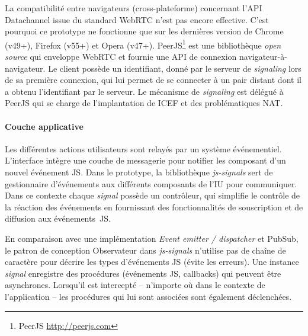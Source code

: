 La compatibilité entre navigateurs 
(cross-plateforme) concernant 
l'\gls{API} Datachannel issue du standard \gls{WebRTC} n'est pas encore 
effective. C'est pourquoi ce prototype ne fonctionne que sur les dernières 
version de Chrome (v49+), Firefox (v55+) et Opera (v47+). 
PeerJS\footnote{PeerJS  \url{http://peerjs.com}} est une 
bibliothèque \textit{open source} qui enveloppe WebRTC et fournie une \gls{API} 
de connexion navigateur-à-navigateur.
Le client possède un identifiant, donné par le serveur de \textit{signaling} lors 
de sa première connexion, qui lui permet de se connecter à un pair distant 
dont il a obtenu l'identifiant par le serveur. Le mécanisme 
de \textit{signaling} est délégué à PeerJS qui se charge de l'implantation de 
\gls{ICEF} et des problématiques \gls{NAT}. 


		\paragraph{Couche applicative}
		
Les différentes actions utilisateurs sont relayés par un système 
événementiel. L'interface intègre une couche de messagerie pour notifier les 
composant d'un nouvel événement \gls{JS}. Dans le prototype, la 
bibliothèque 
\textit{js-signals} sert de gestionnaire d'événements aux différents 
composants de l'\gls{IU} pour 
communiquer. Dans ce contexte chaque \textit{signal} possède un 
contrôleur, qui simplifie le contrôle de la réaction des événements en 
fournissant des fonctionnalités de souscription et de diffusion aux
événements~\gls{JS}. 

En comparaison avec une implémentation \textit{Event 
emitter / dispatcher} et \gls{PubSub}, le patron de conception 
Observateur dans \textit{js-signals} n'utilise pas de chaîne de caractère pour 
décrire les types d'événements \gls{JS} (évite les erreurs).
Une instance \textit{signal} enregistre des procédures (événements \gls{JS}, 
callbacks) qui peuvent être asynchrones. 
Lorsqu'il est intercepté -- n'importe où dans le contexte de l'application -- les 
procédures qui lui sont associées sont également déclenchées.
